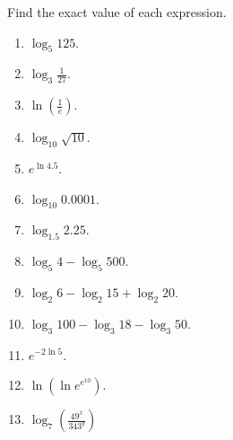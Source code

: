 Find the exact value of each expression.
\begin{multicols}{2}
\begin{enumerate}[ref={\fcProblemRef}]
\item $\displaystyle \log_5 125$. 

\item $\displaystyle \log_3 \frac{1}{27}$. 

\item $\displaystyle \ln \left(\frac{1}{e}\right) $. 

\item $\displaystyle \log_{10}\sqrt{10}$. 

\item $\displaystyle e^{\ln 4.5}$.  

\item $\displaystyle \log_{10} 0.0001 $.  

\item $\displaystyle \log_{1.5}2.25$.  

\item $\displaystyle \log_5 4- \log_5 500$.  

\item $\displaystyle \log_2 6 - \log_2 15 +\log_2 20$. 

\item $\displaystyle \log_3 100- \log_3 18 - \log _3 50 $.  

\item $\displaystyle e^{-2\ln 5}$.  

\item $\displaystyle \ln \left(\ln e^{e^{10}}\right)$. 

\item  \label{problemSimplifylog_7(49^x/343^y)}  $\displaystyle \log_7\left(\frac{49^x}{343^y}\right)$


\end{enumerate}
\end{multicols}